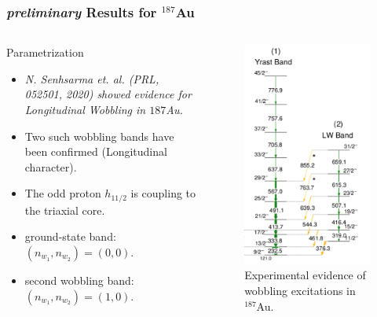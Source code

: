 \documentclass{beamer}
\begin{document}
\begin{frame}
    \frametitle{{\tiny \emph{preliminary}} Results for $^{187}$Au}
    \begin{columns}[c] 
    \begin{block}{Parametrization}
    \begin{itemize}
        \item \textit{N. Senhsarma et. al. (PRL, 052501, 2020) showed evidence for Longitudinal Wobbling in ${187}$Au.}
        \item Two such wobbling bands have been confirmed (Longitudinal character).
        \item The odd proton $h_{11/2}$ is coupling to the triaxial core.
        \item ground-state band: $(n_{w_1},n_{w_2})=(0,0)$.
        \item second wobbling band: $(n_{w_1},n_{w_2})=(1,0)$.
    \end{itemize}
    \end{block}
     \begin{figure}
         \centering
         \includegraphics[scale=0.2]{figs/spectrum_Au187.png}
         \caption{Experimental evidence of wobbling excitations in $^{187}$Au.}
     \end{figure}
    \end{columns}
\end{frame}
\end{document}
